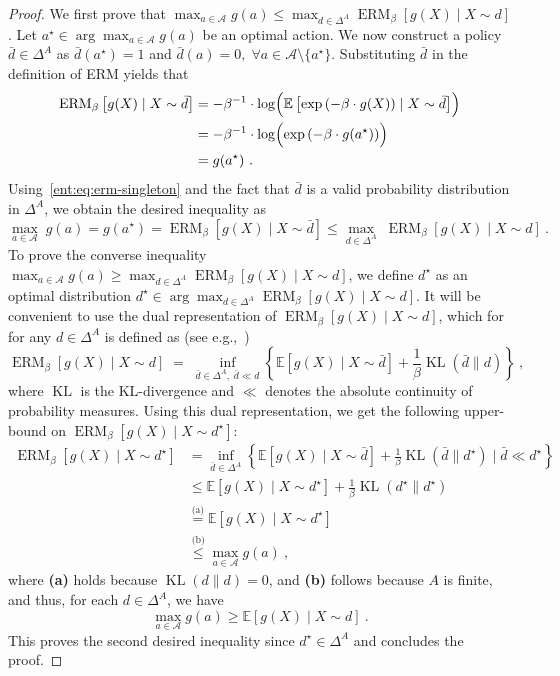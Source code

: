 \documentclass[twoside]{article}
\newcommand{\E}{\mathbb{E}}
\newcommand{\actions}{\mathcal{A}}
\newcommand{\opt}{^\star}
\DeclareMathOperator{\kl}{KL}
\renewcommand{\exp}[1]{\operatorname{exp}\left( #1\right) }
\newcommand{\erm}[2]{\operatorname{ERM}_{#1}\left[#2\right]}
\theoremstyle{plain}
\theoremstyle{definition}
\theoremstyle{remark}
\renewcommand{\cite}[1]{\citep{#1}}
\begin{document}
\begin{proof}
We first prove that $\max_{a \in \actions} g(a) \le \max_{d \in \Delta^A} \erm{\beta}{ g(X) \mid  X \sim d }$. Let $a\opt \in \arg\max_{a\in \actions } g(a)$ be an optimal action. We now construct a policy $\bar{d} \in \Delta^A$ as $\bar{d}(a\opt) = 1$ and $\bar{d}(a) = 0,\;\forall a\in \actions \setminus \{a\opt \}$. Substituting $\bar{d}$ in the definition of ERM yields that
%
\begin{equation} \label{ent:eq:erm-singleton}
\begin{aligned}
\erm{\beta}{g(X) \mid X \sim \bar{d}} &= - \beta^{-1} \cdot \log \Bigl( \E\left[\exp{-\beta\cdot  g(X)} \mid  X \sim \bar{d} \right] \Bigr)  \\
  &= - \beta^{-1} \cdot \log \Bigl( \exp{-\beta\cdot  g(a\opt)} \Bigr) \\
  &= g(a\opt)~.
\end{aligned}
\end{equation}
%
Using~\eqref{ent:eq:erm-singleton} and the fact that $\bar{d}$ is a valid probability distribution in $\Delta^{A}$, we obtain the desired inequality as
%
\[
  \max_{a \in \actions} \; g(a) = g(a\opt) = \erm{\beta}{g(X) \mid X \sim \bar{d}} \le  \max_{d \in \Delta^A} \; \erm{\beta}{g(X) \mid X \sim d} ~.
\]
%
To prove the converse inequality $\max_{a \in \actions} g(a) \ge \max_{d \in \Delta^{A}} \erm{\beta}{ g(X) \mid  X \sim d }$, we define $d\opt$ as an optimal distribution $d\opt \in \arg\max_{d \in \Delta^{A}} \erm{\beta} { g(X) \mid X \sim d }$. It will be convenient to use the dual representation of $\erm{\beta}{g(X) \mid X \sim d}$, which for for any $d \in \Delta^{A}$ is defined as (see e.g.,~\cite{Ahmadi-Javid2012})
% 
\[
  \erm{\beta}{g(X) \mid X \sim d} \; =\; \inf_{\bar{d} \in \Delta^A,\;\bar{d} \ll d}\left\{ \E[g(X) \mid X \sim \bar{d}] + \frac{1}{\beta} \kl(\bar{d} \| d) \right\}~,
\]
%
where $\kl$ is the KL-divergence and $\ll$ denotes the absolute continuity of probability measures. Using this dual representation, we get the following upper-bound on $\erm{\beta} {g(X)  \mid  X \sim d\opt}$:
%
\begin{align*}
\erm{\beta}{g(X) \mid X \sim d\opt} &= \inf_{\bar{d} \in \Delta^A}\left\{ \E[g(X) \mid X \sim \bar{d}] + \frac{1}{\beta} \kl(\bar{d} \| d\opt)\;\vert\; \bar{d} \ll d\opt \right\}  \\
	&\le \E[g(X) \mid X \sim d\opt] + \frac{1}{\beta} \kl(d\opt  \| d\opt)  \\ 
        &\stackrel{\text{(a)}}{=} \E[g(X) \mid X \sim d\opt] \\
  &\stackrel{\text{(b)}}{\leq} \max_{a\in\actions} g(a)~,
\end{align*}
%
where {\bf (a)} holds because $\kl(d \| d) = 0$, and {\bf (b)} follows because $A$ is finite, and thus, for each $d \in \Delta^{A}$, we have
%
\[
  \max_{a\in\actions} g(a) \geq \E\left[g(X) \mid  X \sim d \right]~.
\]
%
This proves the second desired inequality since $d\opt \in \Delta^{A}$ and concludes the proof. 
\end{proof}
\end{document}
